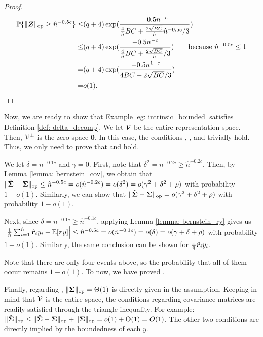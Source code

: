\begin{proof}
\begin{align}
    \nonumber
   \mathbb{P}\{ \lVert {\bm{Z}} \rVert_{\mathrm{op}} \geq \hat{n}^{-0.5c} \}\leq & (q+4)\exp( \frac{-0.5n^{-c}}{ \frac{4}{\hat{n}} BC+\frac{2\sqrt{BC}}{\hat{n}} \hat{n}^{-0.5c}/3   } ) \\
   \nonumber
   \leq & (q+4)\exp( \frac{-0.5n^{-c}}{ \frac{4}{\hat{n}} BC+\frac{2\sqrt{BC}}{\hat{n}} /3   } ) \quad\quad\text{because $\hat{n}^{-0.5c}\leq 1$} \\
   \nonumber
   = &  (q+4)\exp( \frac{-0.5n^{1-c}}{ 4BC+ 2\sqrt{BC} /3   } ) \\
   \nonumber
   = & o(1). 
\end{align}
\end{proof}

Now, we are ready to show that Example \ref{eg: intrinsic_bounded} satisfies Definition \ref{def: delta_decomp}. We let ${\mathcal{V}}$ be the entire representation space. Then, ${\mathcal{V}}^\perp$ is the zero space ${\mathbf{0}}$. In this case, the conditions \isotropy{}, \smallin{}, and \dimini{} trivially hold. Thus, we only need to prove that \bounded{} and \conc{} hold. 

We let $\delta = n^{-0.1c}$ and $\gamma = 0$. First, note that $\delta^2 = n^{-0.2c} \geq \hat{n}^{-0.2c}$. Then, by Lemma \ref{lemma: bernstein_cov}, we obtain that $\lVert \hat{{\bm{\Sigma}}} - {\bm{\Sigma}} \rVert_{\mathrm{op}} \leq \hat{n}^{-0.5c} = o(\hat{n}^{-0.2c}) = o(\delta^2) = o(\gamma^2 + \delta^2 + \rho)$ with probability $1 - o(1)$. Similarly, we can show that $\lVert \tilde{{\bm{\Sigma}}} - {\bm{\Sigma}} \rVert_{\mathrm{op}} = o(\gamma^2 + \delta^2 + \rho)$ with probability $1 - o(1)$.

Next, since $\delta = n^{-0.1c} \geq \hat{n}^{-0.1c}$, applying Lemma \ref{lemma: bernstein_ry} gives us $\left| \frac{1}{\hat{n}} \sum_{i=1}^{\hat{n}}\hat{{\bm{r}}}_i y_i - \mathbb{E}[{\bm{r}} y] \right| \leq \hat{n}^{-0.5c} = o(\hat{n}^{-0.1c}) = o(\delta) = o(\gamma + \delta + \rho)$ with probability $1 - o(1)$. Similarly, the same conclusion can be shown for $\frac{1}{\tilde{n}} \tilde{{\bm{r}}}_i y_i$.

Note that there are only four events above, so the probability that all of them occur remains $1 - o(1)$. To now, we have proved \conc{}.

Finally, regarding \bounded{}, $\lVert {\bm{\Sigma}} \rVert_{\mathrm{op}}=\Theta(1)$ is directly given in the assumption. Keeping in mind that ${\mathcal{V}}$ is the entire space, the conditions regarding covariance matrices are readily satisfied through the triangle inequality. For example: $\lVert \hat{{\bm{\Sigma}}} \rVert_{\mathrm{op}}\leq \lVert \hat{{\bm{\Sigma}}} -{\bm{\Sigma}} \rVert_{\mathrm{op}}+\lVert {\bm{\Sigma}} \rVert_{\mathrm{op}} = o(1)+\Theta(1)=O(1) $. The other two conditions are directly implied by the boundedness of each $y$.

